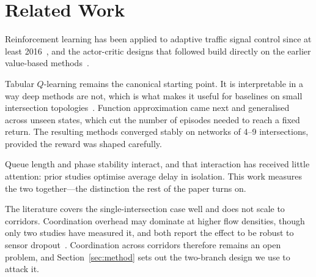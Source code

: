 
\section{Related Work}
\label{sec:related}

Reinforcement learning has been applied to adaptive traffic signal control since
at least 2016~\cite{genders2016,wei2019}, and the actor-critic designs that
followed build directly on the earlier value-based methods~\cite{mnih2015}.

Tabular $Q$-learning remains the canonical starting point. It is interpretable
in a way deep methods are not, which is what makes it useful for baselines on
small intersection topologies~\cite{abdulhai2003}. Function approximation came
next and generalised across unseen states, which cut the number of episodes
needed to reach a fixed return. The resulting methods converged stably on
networks of 4--9 intersections, provided the reward was shaped carefully.

Queue length and phase stability interact, and that interaction has received
little attention: prior studies optimise average delay in isolation. This work
measures the two together---the distinction the rest of the paper turns on.

The literature covers the single-intersection case well and does not scale to
corridors. Coordination overhead may dominate at higher flow densities, though
only two studies have measured it, and both report the effect to be robust to
sensor dropout~\cite{chu2020}. Coordination across corridors therefore remains
an open problem, and Section~\ref{sec:method} sets out the two-branch design we
use to attack it.
